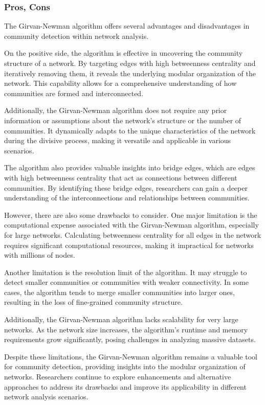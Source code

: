 \subsubsection{Pros, Cons}
The Girvan-Newman algorithm offers several advantages and disadvantages in community detection within network analysis.

On the positive side, the algorithm is effective in uncovering the community structure of a network. By targeting edges with high betweenness centrality and iteratively removing them, it reveals the underlying modular organization of the network. This capability allows for a comprehensive understanding of how communities are formed and interconnected.

Additionally, the Girvan-Newman algorithm does not require any prior information or assumptions about the network's structure or the number of communities. It dynamically adapts to the unique characteristics of the network during the divisive process, making it versatile and applicable in various scenarios.

The algorithm also provides valuable insights into bridge edges, which are edges with high betweenness centrality that act as connections between different communities. By identifying these bridge edges, researchers can gain a deeper understanding of the interconnections and relationships between communities.

However, there are also some drawbacks to consider. One major limitation is the computational expense associated with the Girvan-Newman algorithm, especially for large networks. Calculating betweenness centrality for all edges in the network requires significant computational resources, making it impractical for networks with millions of nodes.

Another limitation is the resolution limit of the algorithm. It may struggle to detect smaller communities or communities with weaker connectivity. In some cases, the algorithm tends to merge smaller communities into larger ones, resulting in the loss of fine-grained community structure.

Additionally, the Girvan-Newman algorithm lacks scalability for very large networks. As the network size increases, the algorithm's runtime and memory requirements grow significantly, posing challenges in analyzing massive datasets.

Despite these limitations, the Girvan-Newman algorithm remains a valuable tool for community detection, providing insights into the modular organization of networks. Researchers continue to explore enhancements and alternative approaches to address its drawbacks and improve its applicability in different network analysis scenarios.

